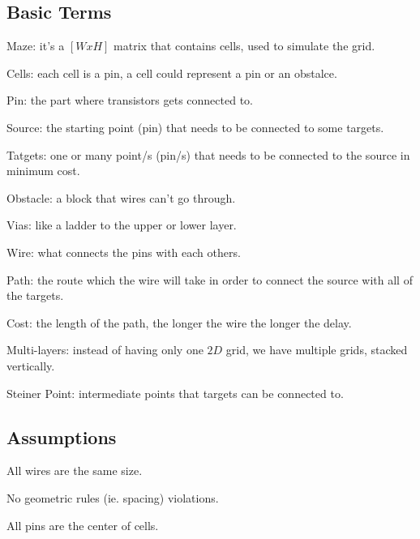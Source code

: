 \subsection{Basic Terms} %

Maze: it's a $[W x H]$ matrix that contains cells, used to simulate the grid.

Cells: each cell is a pin, a cell could represent a pin or an obstalce.

Pin: the part where transistors gets connected to.

Source: the starting point (pin) that needs to be connected to some targets.

Tatgets: one or many point/s (pin/s) that needs to be connected to the source in minimum cost.

Obstacle: a block that wires can't go through.

Vias: like a ladder to the upper or lower layer.

Wire: what connects the pins with each others.

Path: the route which the wire will take in order to connect the source with all of the targets.

Cost: the length of the path, the longer the wire the longer the delay.

Multi-layers: instead of having only one $2D$ grid, we have multiple grids, stacked vertically.

Steiner Point: intermediate points that targets can be connected to.


\subsection{Assumptions} 
All wires are the same size.

No geometric rules (ie. spacing) violations.

All pins are the center of cells.